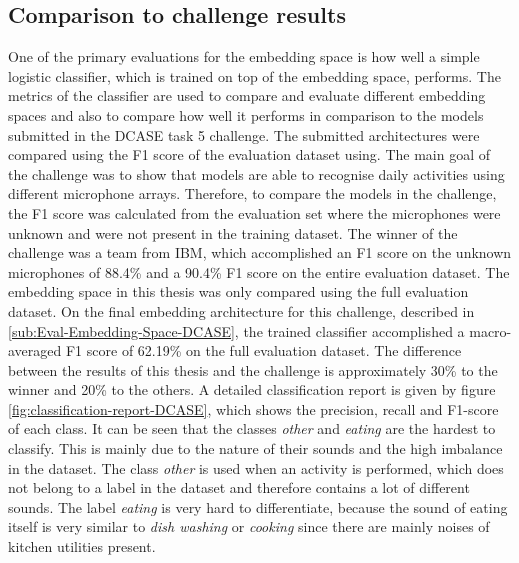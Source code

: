 \subsection{Comparison to challenge results}
\label{sub:Eval-Comparison-DCASE}
One of the primary evaluations for the embedding space is how well a simple logistic classifier, which is trained on top of the embedding space, performs. The metrics of the classifier are used to compare and evaluate different embedding spaces and also to compare how well it performs in comparison to the models submitted in the \gls{DCASE} task 5 challenge. The submitted architectures were compared using the F1 score of the evaluation dataset using. The main goal of the challenge was to show that models are able to recognise daily activities using different microphone arrays. Therefore, to compare the models in the challenge, the F1 score was calculated from the evaluation set where the microphones were unknown and were not present in the training dataset. The winner of the challenge was a team from IBM, which accomplished an F1 score on the unknown microphones of 88.4\% and a 90.4\% F1 score on the entire evaluation dataset. The embedding space in this thesis was only compared using the full evaluation dataset.
\newline
\newline
On the final embedding architecture for this challenge, described in \ref{sub:Eval-Embedding-Space-DCASE}, the trained classifier accomplished a macro-averaged F1 score of 62.19\% on the full evaluation dataset. The difference between the results of this thesis and the challenge is approximately 30\% to the winner and 20\% to the others. A detailed classification report is given by figure \ref{fig:classification-report-DCASE}, which shows the precision, recall and F1-score of each class. It can be seen that the classes \textit{other} and \textit{eating} are the hardest to classify. This is mainly due to the nature of their sounds and the high imbalance in the dataset. The class \textit{other} is used when an activity is performed, which does not belong to a label in the dataset and therefore contains a lot of different sounds. The label \textit{eating} is very hard to differentiate, because the sound of eating itself is very similar to \textit{dish washing} or \textit{cooking} since there are mainly noises of kitchen utilities present.

